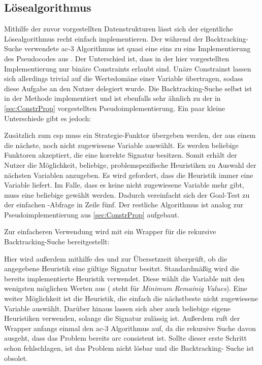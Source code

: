 \subsection{Lösealgorithmus}
Mithilfe der zuvor vorgestellten Datenstrukturen lässt sich der eigentliche Lösealgorithmus recht einfach implementieren. Der während der Backtracking-Suche verwendete \ac*{ac}-3
Algorithmus ist quasi eine eins zu eins Implementierung des Pseudocodes aus \cite{ac3}. Der Unterschied ist, dass in der hier vorgestellten Implementierung nur binäre Constraints
erlaubt sind. Unäre Constrainst lassen sich allerdings trivial auf die Wertedomäne einer Variable übertragen, sodass diese Aufgabe an den Nutzer delegiert wurde.
Die Backtracking-Suche selbst ist in der Methode  implementiert und ist ebenfalls sehr ähnlich zu der in \cref{sec:ConstrProp} vorgestellten
Pseudoimplementierung. Ein paar kleine Unterschiede gibt es jedoch:

Zusätzlich zum \ac*{csp} muss ein Strategie-Funktor übergeben werden, der aus einem  die nächste, noch nicht zugewiesene Variable auswählt. Es werden beliebige
Funktoren akzeptiert, die eine korrekte Signatur besitzen. Somit erhält der Nutzer die Möglichkeit, beliebige, problemspezifische Heuristiken zu Auswahl der nächsten Variablen
anzugeben. Es wird gefordert, dass die Heuristik immer eine Variable liefert. Im Falle, dass es keine nicht zugewiesene Variable mehr gibt, muss eine beliebige gewählt werden.
Dadurch vereinfacht sich der Goal-Test zu der einfachen -Abfrage in Zeile fünf. Der restliche Algorithmus ist analog zur Pseudoimplementierung aus \cref{sec:ConstrProp}
aufgebaut.

Zur einfacheren Verwendung wird mit  ein Wrapper für die rekursive Backtracking-Suche bereitgestellt:

Hier wird außerdem mithilfe des  und  zur Übersetzzeit überprüft, ob die angegebene Heuristik eine gültige Signatur besitzt.
Standardmäßig wird die bereits implementierte Heuristik  verwendet. Diese wählt die Variable mit den wenigsten möglichen Werten aus ( steht
für \textit{Minimum Remainig Values}). Eine weiter Möglichkeit ist die  Heuristik, die einfach die nächstbeste nicht zugewiesene Variable auswählt. Darüber
hinaus lassen sich aber auch beliebige eigene Heuristiken verwenden, solange die Signatur zulässig ist. Außerdem ruft der Wrapper anfangs einmal den \ac*{ac}-3 Algorithmus auf,
da die rekursive Suche davon ausgeht, dass das Problem bereits arc consistent ist. Sollte dieser erste Schritt schon fehlschlagen, ist das Problem nicht lösbar und die Backtracking-
Suche ist obsolet.